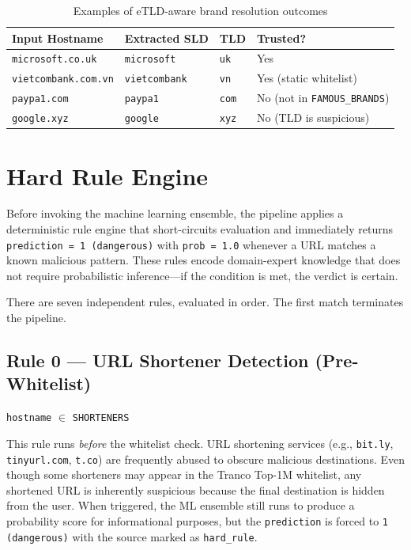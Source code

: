 \documentclass[12pt,a4paper]{article}
\begin{document}
\vspace{0.4cm}
\begin{table}[H]
    \centering
    \begin{tabularx}{\textwidth}{lllX}
        \toprule
        \textbf{Input Hostname} & \textbf{Extracted SLD} & \textbf{TLD} & \textbf{Trusted?} \\
        \midrule
        \texttt{microsoft.co.uk}    & \texttt{microsoft}   & \texttt{uk}  & Yes \\
        \texttt{vietcombank.com.vn} & \texttt{vietcombank} & \texttt{vn}  & Yes (static whitelist) \\
        \texttt{paypa1.com}         & \texttt{paypa1}      & \texttt{com} & No (not in \texttt{FAMOUS\_BRANDS}) \\
        \texttt{google.xyz}         & \texttt{google}      & \texttt{xyz} & No (TLD is suspicious) \\
        \bottomrule
    \end{tabularx}
    \caption{Examples of eTLD-aware brand resolution outcomes}
    \label{tab:whitelist_examples}
\end{table}

\section{Hard Rule Engine}

Before invoking the machine learning ensemble, the pipeline applies a deterministic rule engine that short-circuits evaluation and immediately returns \texttt{prediction = 1 (dangerous)} with \texttt{prob = 1.0} whenever a URL matches a known malicious pattern. These rules encode domain-expert knowledge that does not require probabilistic inference---if the condition is met, the verdict is certain.

There are seven independent rules, evaluated in order. The first match terminates the pipeline.

\subsection{Rule 0 --- URL Shortener Detection (Pre-Whitelist)}
\begin{center}
\texttt{hostname} $\in$ \texttt{SHORTENERS}
\end{center}
\noindent This rule runs \textit{before} the whitelist check. URL shortening services (e.g., \texttt{bit.ly}, \texttt{tinyurl.com}, \texttt{t.co}) are frequently abused to obscure malicious destinations. Even though some shorteners may appear in the Tranco Top-1M whitelist, any shortened URL is inherently suspicious because the final destination is hidden from the user. When triggered, the ML ensemble still runs to produce a probability score for informational purposes, but the \texttt{prediction} is forced to \texttt{1 (dangerous)} with the source marked as \texttt{hard\_rule}.
\end{document}
